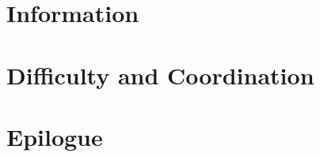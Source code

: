 \documentclass[11pt,oneside,a4paper]{book}
\theoremstyle{definition}
\theoremstyle{plain}
\theoremstyle{remark}
\begin{document}
\part{Information}





\part{Difficulty and Coordination}










\part{Epilogue}



\appendix








\backmatter




\printindex
\end{document}
